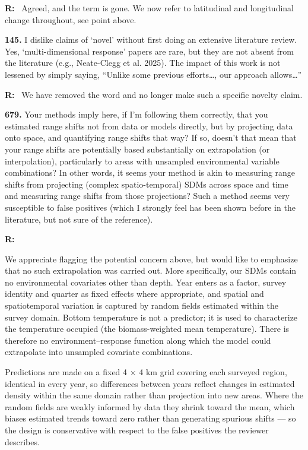 \documentclass[11pt]{article}
\newcommand{\reviewer}[1]{\par\medskip\noindent\textcolor{revcolor}{#1}\par}
\newenvironment{reply}
{\par\smallskip\begingroup\color{replycolor}\noindent\textbf{R:}\ }
{\endgroup\par\medskip}
\begin{document}
\begin{reply}
Agreed, and the term is gone. We now refer to latitudinal and longitudinal change throughout, see point above.
\end{reply}

\reviewer{\textbf{145.} I dislike claims of `novel' without first doing an extensive literature review. Yes, `multi-dimensional response' papers are rare, but they are not absent from the literature (e.g., Neate-Clegg et al. 2025). The impact of this work is not lessened by simply saying, ``Unlike some previous
efforts\ldots, our approach allows\ldots''}

\begin{reply}
We have removed the word and no longer make such a specific novelty claim.
\end{reply}

\reviewer{\textbf{679.} Your methods imply here, if I'm following them correctly, that you estimated range shifts not from data or models directly, but by projecting data onto space, and quantifying range shifts that way? If so, doesn't that mean that your range shifts are potentially based substantially on extrapolation (or interpolation), particularly to areas with unsampled environmental variable combinations? In other words, it seems your method is akin to measuring range shifts from projecting (complex spatio-temporal) SDMs across space and time and measuring range shifts from those projections? Such a method seems very susceptible to false positives (which I strongly feel has been shown before in the literature, but not sure of the reference).}

\begin{reply}

We appreciate flagging the potential concern above, but would like to emphasize that no such extrapolation was carried out. More specifically, our SDMs contain no environmental covariates other than depth. Year enters as a factor, survey identity and quarter as fixed effects where appropriate, and spatial and spatiotemporal variation is captured by random fields estimated within the survey domain. Bottom temperature is not a predictor; it is used to characterize the temperature occupied (the biomass-weighted mean temperature). There is therefore no environment–response function along which the model could extrapolate into unsampled covariate combinations.

Predictions are made on a fixed 4 × 4 km grid covering each surveyed region, identical in every year, so differences between years reflect changes in estimated density within the same domain rather than projection into new areas. Where the random fields are weakly informed by data they shrink toward the mean, which biases estimated trends toward zero rather than generating spurious shifts — so the design is conservative with respect to the false positives the reviewer describes.
\end{reply}
\end{document}

